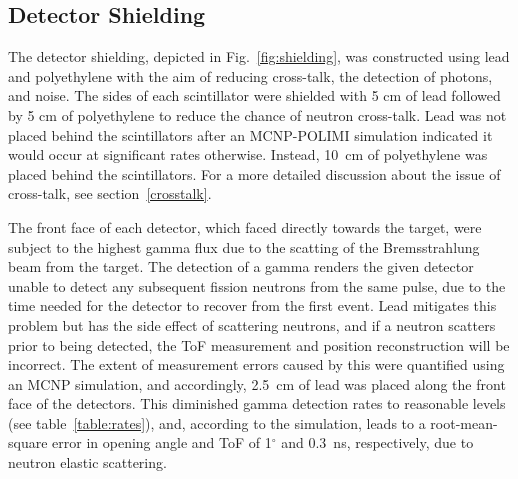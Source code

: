 \subsection{Detector Shielding}
\label{shielding}
The detector shielding, depicted in Fig.~\ref{fig:shielding}, was constructed using lead and polyethylene with the aim of reducing cross-talk, the detection of photons, and noise.
The sides of each scintillator were shielded with 5 cm of lead followed by 5 cm of polyethylene to reduce the chance of neutron cross-talk.
Lead was not placed behind the scintillators after an MCNP-POLIMI simulation indicated it would occur at significant rates otherwise.
Instead, 10~cm of polyethylene was placed behind the scintillators.
For a more detailed discussion about the issue of cross-talk, see section~\ref{crosstalk}.

The front face of each detector, which faced directly towards the target, were subject to the highest gamma flux due to the scatting of the Bremsstrahlung beam from the target.
The detection of a gamma renders the given detector unable to detect any subsequent fission neutrons from the same pulse, due to the time needed for the detector to recover from the first event.
Lead mitigates this problem but has the side effect of scattering neutrons, and if a neutron scatters prior to being detected, the ToF measurement and position reconstruction will be incorrect.
The extent of measurement errors caused by this were quantified using an MCNP simulation, and accordingly, 2.5~cm of lead was placed along the front face of the detectors.
This diminished gamma detection rates to reasonable levels (see table~\ref{table:rates}), and, according to the simulation, leads to a root-mean-square error in opening angle and ToF of 1$^{\circ}$ and 0.3~ns, respectively, due to neutron elastic scattering.

